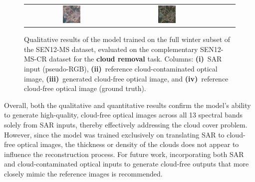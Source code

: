 \begin{figure}[!htbp]
\begin{tabular}{c *{4}{c}}
        \includegraphics[width=0.2\textwidth, height=0.2\textheight, keepaspectratio]{img/cloud_removal/sample_000150_pred_rgb.png} &
        \includegraphics[width=0.2\textwidth, height=0.2\textheight, keepaspectratio]{img/cloud_removal/sample_000150_true_rgb.png} \\
    \end{tabular}

    \caption[Qualitative results on cloud removal]{%
    Qualitative results of the model trained on the full winter subset of the SEN12-MS dataset, evaluated on the complementary SEN12-MS-CR dataset for the \textbf{cloud removal} task.  
    Columns: 
    \textbf{(i)}~SAR input (pseudo-RGB), 
    \textbf{(ii)}~reference cloud-contaminated optical image, 
    \textbf{(iii)}~generated cloud-free optical image, and 
    \textbf{(iv)}~reference cloud-free optical image (ground truth).}
    \label{fig:qualitative_results_cloud_removal}
\end{figure}

Overall, both the qualitative and quantitative results confirm the model’s ability to generate high-quality, cloud-free optical images across all 13 spectral bands solely from SAR inputs, thereby effectively addressing the cloud cover problem. However, since the model was trained exclusively on translating SAR to cloud-free optical images, the thickness or density of the clouds does not appear to influence the reconstruction process. For future work, incorporating both SAR and cloud-contaminated optical inputs to generate cloud-free outputs that more closely mimic the reference images is recommended.
